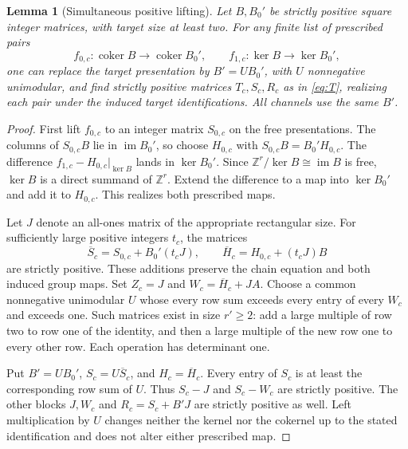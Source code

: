 \documentclass[11pt]{article}
\newtheorem{lemma}[theorem]{Lemma}
\theoremstyle{remark}\newtheorem{remark}[theorem]{Remark}
\newcommand{\Z}{\mathbb Z}\newcommand{\C}{\mathbb C}
\newcommand{\coker}{\operatorname{coker}}\newcommand{\rank}{\operatorname{rank}}
\begin{document}
\begin{lemma}[Simultaneous positive lifting]\label{lem:positive}
Let $B,B_0'$ be strictly positive square integer matrices, with target
size at least two. For any finite list of prescribed pairs
\[
 f_{0,c}:\coker B\to\coker B_0',\qquad
 f_{1,c}:\ker B\to\ker B_0',
\]
one can replace the target presentation by $B'=UB_0'$, with $U$
nonnegative unimodular, and find strictly positive matrices $T_c,S_c,R_c$
as in \eqref{eq:T}, realizing each pair under the induced target
identifications. All channels use the same $B'$.
\end{lemma}
\begin{proof}
First lift $f_{0,c}$ to an integer matrix $S_{0,c}$ on the free presentations.
The columns of $S_{0,c}B$ lie in $\operatorname{im}B_0'$, so choose
$H_{0,c}$ with $S_{0,c}B=B_0'H_{0,c}$. The difference
$f_{1,c}-H_{0,c}|_{\ker B}$ lands in $\ker B_0'$. Since
$\Z^r/\ker B\cong\operatorname{im}B$ is free, $\ker B$ is a direct
summand of $\Z^r$. Extend the difference to a map into $\ker B_0'$
and add it to $H_{0,c}$. This realizes both prescribed maps.

Let $J$ denote an all-ones matrix of the appropriate rectangular size.
For sufficiently large positive integers $t_c$, the matrices
\[
 \overline S_c=S_{0,c}+B_0'(t_cJ),\qquad
 \overline H_c=H_{0,c}+(t_cJ)B
\]
are strictly positive. These additions preserve the chain equation and
both induced group maps. Set $Z_c=J$ and
$W_c=\overline H_c+J A$. Choose a common nonnegative unimodular $U$
whose every row sum exceeds every entry of every $W_c$ and exceeds one.
Such matrices exist in size $r'\ge2$: add a large multiple of row two
to row one of the identity, and then a large multiple of the new row one
to every other row. Each operation has determinant one.

Put $B'=UB_0'$, $S_c=U\overline S_c$, and $H_c=\overline H_c$.
Every entry of $S_c$ is at least the corresponding row sum of $U$.
Thus $S_c-J$ and $S_c-W_c$ are strictly positive. The other blocks
$J,W_c$ and $R_c=S_c+B'J$ are strictly positive as well.
Left multiplication by $U$ changes neither the kernel nor the cokernel
up to the stated identification and does not alter either prescribed map.
\end{proof}
\end{document}

